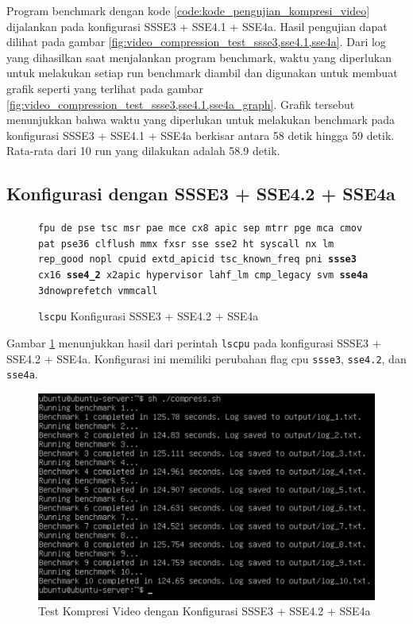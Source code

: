 Program benchmark dengan kode \ref{code:kode_pengujian_kompresi_video} dijalankan pada konfigurasi SSSE3 + SSE4.1 + SSE4a. Hasil pengujian dapat dilihat pada gambar \ref{fig:video_compression_test_ssse3,sse4.1,sse4a}. Dari log yang dihasilkan saat menjalankan program benchmark, waktu yang diperlukan untuk melakukan setiap run benchmark diambil dan digunakan untuk membuat grafik seperti yang terlihat pada gambar \ref{fig:video_compression_test_ssse3,sse4.1,sse4a_graph}. Grafik tersebut menunjukkan bahwa waktu yang diperlukan untuk melakukan benchmark pada konfigurasi SSSE3 + SSE4.1 + SSE4a berkisar antara 58 detik hingga 59 detik. Rata-rata dari 10 run yang dilakukan adalah 58.9 detik.

\subsection{Konfigurasi dengan SSSE3 + SSE4.2 + SSE4a}
\begin{figure}
    \texttt{fpu de pse tsc msr pae mce cx8 apic sep mtrr pge mca cmov pat pse36 clflush mmx fxsr sse sse2 ht syscall nx lm rep\_good nopl cpuid extd\_apicid tsc\_known\_freq pni \textbf{ssse3} cx16 \textbf{sse4\_2} x2apic hypervisor lahf\_lm cmp\_legacy svm \textbf{sse4a} 3dnowprefetch vmmcall}
    \caption{\texttt{lscpu} Konfigurasi SSSE3 + SSE4.2 + SSE4a}
    \label{fig:lscpu_video_compression_test_ssse3,sse4.2,sse4a.jpeg}
\end{figure}

Gambar \ref{fig:lscpu_video_compression_test_ssse3,sse4.2,sse4a.jpeg} menunjukkan hasil dari perintah \texttt{lscpu} pada konfigurasi SSSE3 + SSE4.2 + SSE4a. Konfigurasi ini memiliki perubahan flag cpu \texttt{ssse3}, \texttt{sse4.2}, dan \texttt{sse4a}.

\begin{figure}
    \centering
    \includegraphics[width=1\textwidth]
    {assets/pics/video-compression-test/ssse3,sse4.2,sse4a.jpeg}
    \caption{Test Kompresi Video dengan Konfigurasi SSSE3 + SSE4.2 + SSE4a}
    \label{fig:video_compression_test_ssse3,sse4.2,sse4a.jpeg}
\end{figure}

